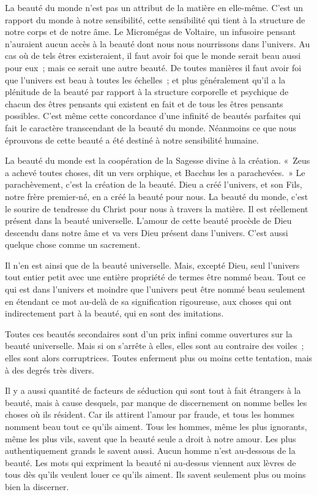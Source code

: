 \documentclass[french,twoside]{book} %
\begin{document}
La beauté du monde n'est pas un attribut de la matière en elle-même. C'est un rapport du monde à notre sensibilité, cette sensibilité qui tient à la structure de notre corps et de notre âme. Le Micromégas de Voltaire, un infusoire pensant n'auraient aucun accès à la beauté dont nous nous nourrissons dans l'univers. Au cas où de tels êtres existeraient, il faut avoir foi que le monde serait beau aussi pour eux ; mais ce serait une autre beauté. De toutes manières il faut avoir foi que l'univers est beau à toutes les échelles ; et plus généralement qu'il a la plénitude de la beauté par rapport à la structure corporelle et psychique de chacun des êtres pensants qui existent en fait et de tous les êtres pensants possibles. C'est même cette concordance d'une infinité de beautés parfaites qui fait le caractère transcendant de la beauté du monde. Néanmoins ce que nous éprouvons de cette beauté a été destiné à notre sensibilité humaine.\par
La beauté du monde est la coopération de la Sagesse divine à la création. « Zeus a achevé toutes choses, dit un vers orphique, et Bacchus les a parachevées. » Le parachèvement, c'est la création de la beauté. Dieu a créé l'univers, et son Fils, notre frère premier-né, en a créé la beauté pour nous. La beauté du monde, c'est le sourire de tendresse du Christ pour nous à travers la matière. Il est réellement présent dans la beauté universelle. L'amour de cette beauté procède de Dieu descendu dans notre âme et va vers Dieu présent dans l'univers. C'est aussi quelque chose comme un sacrement.\par
Il n'en est ainsi que de la beauté universelle. Mais, excepté Dieu, seul l'univers tout entier petit avec une entière propriété de termes être nommé beau. Tout ce qui est dans l'univers et moindre que l'univers peut être nommé beau seulement en étendant ce mot au-delà de sa signification rigoureuse, aux choses qui ont indirectement part à la beauté, qui en sont des imitations.\par
Toutes ces beautés secondaires sont d'un prix infini comme ouvertures sur la beauté universelle. Mais si on s'arrête à elles, elles sont au contraire des voiles ; elles sont alors corruptrices. Toutes enferment plus ou moins cette tentation, mais à des degrés très divers.\par
Il y a aussi quantité de facteurs de séduction qui sont tout à fait étrangers à la beauté, mais à cause desquels, par manque de discernement on nomme belles les choses où ils résident. Car ils attirent l'amour par fraude, et tous les hommes nomment beau tout ce qu'ils aiment. Tous les hommes, même les plus ignorants, même les plus vils, savent que la beauté seule a droit à notre amour. Les plus authentiquement grands le savent aussi. Aucun homme n'est au-dessous de la beauté. Les mots qui expriment la beauté ni au-dessus viennent aux lèvres de tous dès qu'ils veulent louer ce qu'ils aiment. Ils savent seulement plus ou moins bien la discerner.\par
\end{document}
